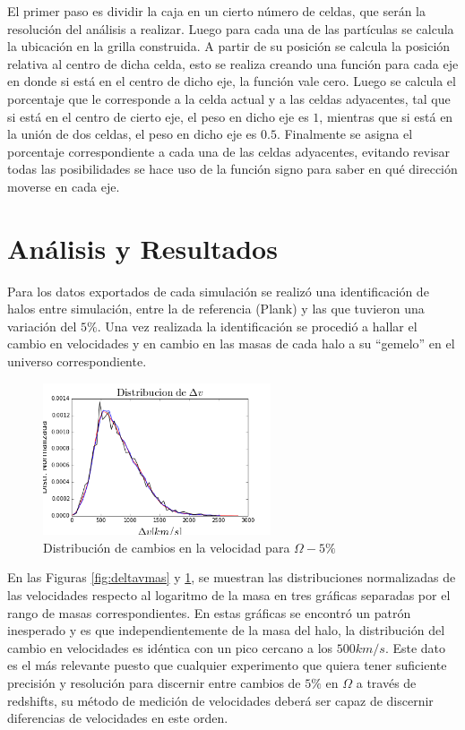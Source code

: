 El primer paso es dividir la caja en un cierto número de celdas, que serán la resolución del análisis a realizar. Luego para cada una de las partículas se calcula la ubicación en la grilla construida. A partir de su posición se calcula la posición relativa al centro de dicha celda, esto se realiza creando una función para cada eje en donde si está en el centro de dicho eje, la función vale cero. Luego se calcula el porcentaje que le corresponde a la celda actual y a las celdas adyacentes, tal que si está en el centro de cierto eje, el peso en dicho eje es $1$, mientras que si está en la unión de dos celdas, el peso en dicho eje es $0.5$. Finalmente se asigna el porcentaje correspondiente a cada una de las celdas adyacentes, evitando revisar todas las posibilidades se hace uso de la función signo para saber en qué dirección moverse en cada eje. 


\section{Análisis y Resultados}
Para los datos exportados de cada simulación se realizó una identificación de halos entre simulación, entre la de referencia (Plank) y las que tuvieron una variación del $5\%$. Una vez realizada la identificación se procedió a hallar el cambio en velocidades y en cambio en las masas de cada halo a su ``gemelo'' en el universo correspondiente.


\begin{figure}[h]
\centering
\includegraphics[width=0.6\textwidth]{Trabajo/deltavmenos}
\caption{Distribución de cambios en la velocidad para $\Omega-5\%$}
\label{fig:deltavmenos}
\end{figure}
En las Figuras \ref{fig:deltavmas} y \ref{fig:deltavmenos}, se muestran las distribuciones normalizadas de las velocidades respecto al logaritmo de la masa en tres gráficas separadas por el rango de masas correspondientes. En estas gráficas se encontró un patrón inesperado y es que independientemente de la masa del halo, la distribución del cambio en velocidades es idéntica con un pico cercano a los $500km/s$. Este dato es el más relevante puesto que cualquier experimento que quiera tener suficiente precisión y resolución para discernir entre cambios de $5\%$ en $\Omega$ a través de redshifts, su método de medición de velocidades deberá ser capaz de discernir diferencias de velocidades en este orden.

